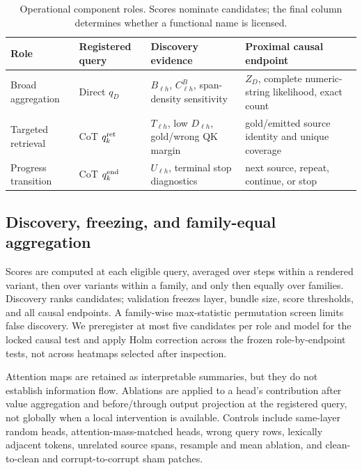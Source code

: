 \begin{table}[H]
\centering
\small
\caption{Operational component roles. Scores nominate candidates; the final
column determines whether a functional name is licensed.}
\label{tab:head-roles}
\begin{tabularx}{\textwidth}{@{}P{.20\textwidth}P{.18\textwidth}P{.22\textwidth}Y@{}}
\toprule
Role & Registered query & Discovery evidence & Proximal causal endpoint \\
\midrule
Broad aggregation
  & Direct \(q_D\)
  & \(B_{\ell h}\), \(C_{\ell h}^B\), span-density sensitivity
  & \(Z_D\), complete numeric-string likelihood, exact count \\
Targeted retrieval
  & CoT \(q_k^{\rm ret}\)
  & \(T_{\ell h}\), low \(D_{\ell h}\), gold/wrong QK margin
  & gold/emitted source identity and unique coverage \\
Progress transition
  & CoT \(q_k^{\rm end}\)
  & \(U_{\ell h}\), terminal stop diagnostics
  & next source, repeat, continue, or stop \\
\bottomrule
\end{tabularx}
\end{table}

\subsection{Discovery, freezing, and family-equal aggregation}

Scores are computed at each eligible query, averaged over steps within a
rendered variant, then over variants within a family, and only then equally
over families. Discovery ranks candidates; validation freezes layer, bundle
size, score thresholds, and all causal endpoints. A family-wise max-statistic
permutation screen limits false discovery. We preregister at most five
candidates per role and model for the locked causal test and apply Holm
correction across the frozen role-by-endpoint tests, not across heatmaps
selected after inspection.

Attention maps are retained as interpretable summaries, but they do not
establish information flow. Ablations are applied to a head's contribution
after value aggregation and before/through output projection at the registered
query, not globally when a local intervention is available. Controls include
same-layer random heads, attention-mass-matched heads, wrong query rows,
lexically adjacent tokens, unrelated source spans, resample and mean ablation,
and clean-to-clean and corrupt-to-corrupt sham patches.

